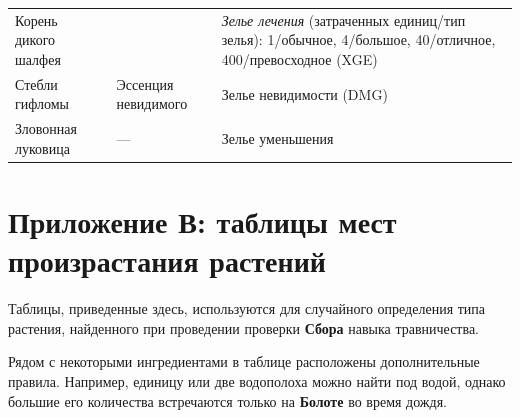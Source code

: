 \documentclass[a4paper, 9pt, twocolumn]{book}
\begin{document}
\begin{tabularx}{\linewidth}{T E X}
		Корень дикого шалфея &  & \textit{Зелье лечения} (затраченных единиц/тип зелья): 1/обычное, 4/большое, 40/отличное, 400/превосходное (XGE) \\ %
		
		Стебли гифломы & Эссенция невидимого & Зелье невидимости (DMG) \\
		
		Зловонная луковица & --- & Зелье уменьшения \\
		
	\end{tabularx}


	\twocolumn

	\chapter{Приложение В: таблицы мест произрастания растений} %
	
	Таблицы, приведенные здесь, используются для случайного определения типа растения, найденного при проведении проверки \textbf{Сбора} навыка травничества.
	
	Рядом с некоторыми ингредиентами в таблице расположены дополнительные правила. Например, единицу или две водополоха можно найти под водой, однако большие его количества встречаются только на \textbf{Болоте} во время дождя.
	
\end{document}
